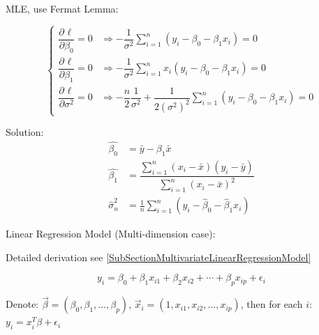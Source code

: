 \begin{enumerate}
    MLE, use Fermat Lemma:

\begin{equation}
    \begin{cases}
        \dfrac{\partial^{} \ell}{\partial \beta _0^{}}=0&\Rightarrow -\dfrac{1}{\sigma ^2}{\displaystyle\sum_{i=1}^n(y_i-\beta _0-\beta _1x_i)}=0\\
        \dfrac{\partial^{} \ell}{\partial \beta _1^{}}=0&\Rightarrow -\dfrac{1}{\sigma ^2}{\displaystyle\sum_{i=1}^nx_i(y_i-\beta _0-\beta _1x_i)}=0\\
        \dfrac{\partial^{} \ell}{\partial \sigma^2}=0&\Rightarrow -\dfrac{n}{2}\dfrac{1}{\sigma ^2}+\dfrac{1}{2(\sigma ^2)^2} {\displaystyle\sum_{i=1}^n(y_i-\beta _0-\beta _1x_i)}=0
    \end{cases} 
\end{equation}

    Solution:
    \begin{align}
        \hat{\beta_0}&=\bar{y}-\beta_1\bar{x}\\
        \hat{\beta_1}&=\dfrac{\sum_{i=1}^n(x_i-\bar{x})(y_i-\bar{y})}{\sum_{i=1}^n(x_i-\bar{x})^2}\\
        \hat{\sigma}^2_n&=\frac{1}{n}\sum_{i=1}^n(y_i-\hat{\beta}_0-\hat{\beta}_1x_i)
    \end{align}
    
    
    \end{enumerate}

\begin{point}
    Linear Regression Model (Multi-dimension case):
\end{point}

    Detailed derivation see \autoref{SubSectionMultivariateLinearRegressionModel}
    
\begin{equation}
    y_i=\beta_0+\beta_1x_{i1}+\beta_2x_{i2}+\cdots+\beta_px_{ip}+\epsilon_i    
\end{equation}

    Denote: $\vec{\beta}=(\beta_0,\beta_1,\ldots,\beta_p),\, \vec{x}_i=(1,x_{i1},x_{i2},\ldots,x_{ip})$, then for each $i$: $y_i=x_i^T\beta+\epsilon_i$

